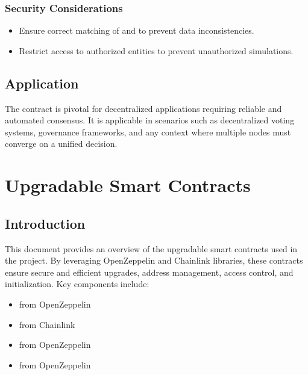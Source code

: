 \documentclass[a4paper,10pt,english]{sphinxmanual}
\begin{document}
\subsection{Security Considerations}
\label{\detokenize{docs_consensus_mechanism_contract:id10}}\begin{itemize}
\item {} 
\sphinxAtStartPar
{} Ensure correct matching of  and  to prevent data inconsistencies.

\item {} 
\sphinxAtStartPar
{} Restrict access to authorized entities to prevent unauthorized simulations.

\end{itemize}


\section{Application}
\label{\detokenize{docs_consensus_mechanism_contract:application}}
\sphinxAtStartPar
The  contract is pivotal for decentralized applications requiring reliable and automated consensus. It is applicable in scenarios such as decentralized voting systems, governance frameworks, and any context where multiple nodes must converge on a unified decision.

\sphinxstepscope


\chapter{Upgradable Smart Contracts}
\label{\detokenize{docs_upgradable_contract:upgradable-smart-contracts}}\label{\detokenize{docs_upgradable_contract::doc}}

\section{Introduction}
\label{\detokenize{docs_upgradable_contract:introduction}}
\sphinxAtStartPar
This document provides an overview of the upgradable smart contracts used in the project. By leveraging OpenZeppelin and Chainlink libraries, these contracts ensure secure and efficient upgrades, address management, access control, and initialization. Key components include:
\begin{itemize}
\item {} 
\sphinxAtStartPar
{} from OpenZeppelin

\item {} 
\sphinxAtStartPar
{} from Chainlink

\item {} 
\sphinxAtStartPar
{} from OpenZeppelin

\item {} 
\sphinxAtStartPar
{} from OpenZeppelin

\end{itemize}
\end{document}
